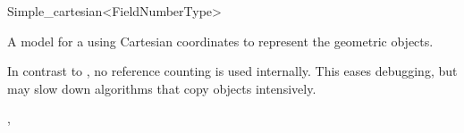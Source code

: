 \begin{ccRefClass}{Simple_cartesian<FieldNumberType>}

\ccDefinition
A model for a  using Cartesian coordinates to represent the
geometric objects. 

\ccRefines
{}

\ccTypes
{}
\ccGlue
{}

\ccImplementation In contrast to , no reference counting
is used internally. This eases debugging, but may slow down algorithms
that copy objects intensively.

\ccSeeAlso
{}, 
\end{ccRefClass}
